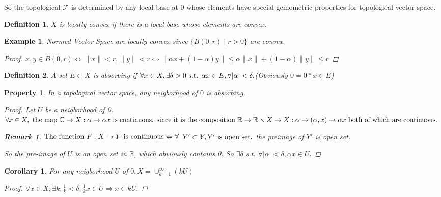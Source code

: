 \documentclass{article}
\newtheorem*{property}{Property}
\newtheorem*{definition}{Definition}
\newtheorem*{remark}{Remark}
\newtheorem*{example}{Example}
\newtheorem*{corollary}{Corollary}
\begin{document}
  So the topological $\mathcal{F}$ is determined by any local base at $0$ 
  whose elements have special gemometric properties for topological vector space.
\begin{definition}
  $X$ is locally convex if there is a local base whose elements are convex.
\end{definition}
\begin{example}
  Normed Vector Space are locally convex since $\{B(0, r) \mid r > 0\}$ are convex.
  \begin{proof}
    $
    x, y \in B(0, r) \Leftrightarrow \|x\| < r, \|y\| < r \Leftrightarrow 
    \|\alpha x + (1 - \alpha)y\| \le \alpha\|x\| + (1 - \alpha)\|y\| \le r
    $
  \end{proof}
\end{example}
\begin{definition}
  A set $E \subset X$ is absorbing if 
  $
  \forall x \in X, \exists \delta > 0 \textnormal{ s.t. } \alpha x \in E, 
  \forall |\alpha| < \delta.
$(Obviously $0 = 0 * x \in E$)
  
\end{definition}

\begin{property}
In a topological vector space, any neigborhood of $0$ is absorbing.
\begin{proof}
  Let $U$ be a neigborhood of 0. 
  $
  \forall x \in X, \textnormal{ the map } \mathbb{C} \rightarrow X: 
  \alpha \rightarrow \alpha x
  \textnormal{ is continuous. since it is the composition }
  \mathbb{R} \rightarrow \mathbb{R} \times X \rightarrow X: 
  \alpha \rightarrow (\alpha, x) \rightarrow \alpha x 
  \textnormal{ both of which are continuous. }
  $
  \begin{remark}
    $
    \textnormal{The function } F: X \rightarrow Y 
    \textnormal{ is continuous} \Leftrightarrow 
    \forall     
    $
    $
    Y' \subset Y, Y' \textnormal{ is open set,}
    $
    the preimage of $Y'$ is open set. 
  \end{remark}
  So the pre-image of $U$ is an open set in $\mathbb{R}$, which obviously contains 0.
  So $\exists \delta$ s.t. $\forall |\alpha| < \delta, \alpha x \in U.$
\end{proof}
\end{property}
\begin{corollary}
  For any neigborhood $U$ of $0, X = \cup_{k=1}^{\infty}(kU)$
  \begin{proof}
    $
      \forall x \in X, \exists k, 
      \frac{1}{k} < \delta, \frac{1}{k} x \in U \Rightarrow x \in kU.
    $
  \end{proof}
\end{corollary}
\end{document}
